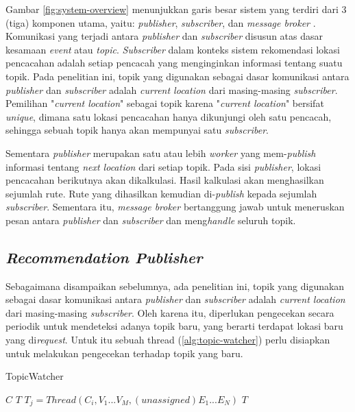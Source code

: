 Gambar \ref{fig:system-overview} menunjukkan garis besar sistem yang terdiri dari 3 (tiga) komponen utama, yaitu: \textit{publisher}, \textit{subscriber}, dan \textit{message broker} \citep{banavar_efficient_1999}. Komunikasi yang terjadi antara \textit{publisher} dan \textit{subscriber} disusun atas dasar kesamaan \textit{event} atau \textit{topic}. \textit{Subscriber} dalam konteks sistem rekomendasi lokasi pencacahan adalah setiap pencacah yang menginginkan informasi tentang suatu topik. Pada penelitian ini, topik yang digunakan sebagai dasar komunikasi antara \textit{publisher} dan \textit{subscriber} adalah \textit{current location} dari masing-masing \textit{subscriber}. Pemilihan "\textit{current location}" sebagai topik karena "\textit{current location}" bersifat \textit{unique}, dimana satu lokasi pencacahan hanya dikunjungi oleh satu pencacah, sehingga sebuah topik hanya akan mempunyai satu \textit{subscriber}.


Sementara \textit{publisher} merupakan satu atau lebih \textit{worker} yang mem-\textit{publish} informasi tentang \textit{next location} dari setiap topik. Pada sisi \textit{publisher}, lokasi pencacahan berikutnya akan dikalkulasi. Hasil kalkulasi akan menghasilkan sejumlah rute. Rute yang dihasilkan kemudian di-\textit{publish} kepada sejumlah \textit{subscriber}. Sementara itu, \textit{message broker} bertanggung jawab untuk meneruskan pesan antara \textit{publisher} dan \textit{subscriber} dan meng\textit{handle} seluruh topik.


\subsection{\textit{Recommendation Publisher}}


Sebagaimana disampaikan sebelumnya, ada penelitian ini, topik yang digunakan sebagai dasar komunikasi antara \textit{publisher} dan \textit{subscriber} adalah \textit{current location} dari masing-masing \textit{subscriber}. Oleh karena itu, diperlukan pengecekan secara periodik untuk mendeteksi adanya topik baru, yang berarti terdapat lokasi baru yang di\textit{request}. Untuk itu sebuah thread (\autoref{alg:topic-watcher}) perlu disiapkan untuk melakukan pengecekan terhadap topik yang baru.


\begin{algorithm}[!]
	\caption{TopicWatcher}
	\label{alg:topic-watcher}
	\begin{algorithmic}[1]
		\renewcommand{\algorithmicrequire}{\textbf{Input:}}
		\renewcommand{\algorithmicensure}{\textbf{Output:}}
		\REQUIRE $C$
		\ENSURE  $T$
					\STATE $T_j = Thread(C_i, V_1...V_M, (unassigned) E_1...E_N)$
				\ENDIF
			\ENDFOR
		\ENDFOR
		\RETURN $T$
	\end{algorithmic}
\end{algorithm}


